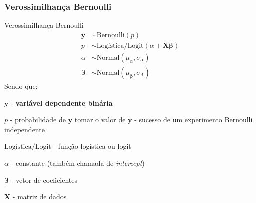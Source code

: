 \subsubsection{Verossimilhança Bernoulli}
\begin{frame}{Verossimilhança Bernoulli}
    \small
    $$
    \begin{aligned}
    \boldsymbol{y} &\sim \text{Bernoulli}\left( p\right) \\
    p &\sim \text{Logística/Logit}(\alpha +  \mathbf{X} \boldsymbol{\beta}) \\
    \alpha &\sim \text{Normal}(\mu_\alpha, \sigma_\alpha) \\
    \boldsymbol{\beta} &\sim \text{Normal}(\mu_{\boldsymbol{\beta}}, \sigma_{\boldsymbol{\beta}})
    \end{aligned}
    $$
    Sendo que:
    \begin{vfilleditems}
        \item \small $\boldsymbol{y}$ - \textbf{variável dependente binária}
        \item \small $p$ - probabilidade de $\boldsymbol{y}$ tomar o valor de $\boldsymbol{y}$ - sucesso de um experimento Bernoulli independente
        \item \small $\text{Logística/Logit}$ - função logística ou logit
        \item \small $\alpha$ - constante (também chamada de \textit{intercept})
        \item \small $\boldsymbol{\beta}$ - vetor de coeficientes
        \item \small $\mathbf{X}$ - matriz de dados
    \end{vfilleditems}
\end{frame}

